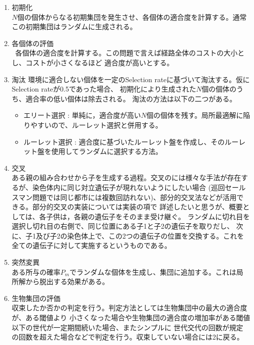 \documentclass[uplatex]{jsarticle}
\begin{document}
\begin{enumerate}
  \item 初期化 \mbox{}\\
  $N$個の個体からなる初期集団を発生させ、各個体の適合度を計算する。通常この初期集団はランダムに生成される。

  \item 各個体の評価 \mbox{}\\\
  各個体の適合度を計算する。この問題で言えば経路全体のコストの大小とし、コストが小さくなるほど
  適合度が高いとする。

  \item 淘汰
  環境に適合しない個体を一定のSelection rateに基づいて淘汰する。仮にSelection rateが0.5であった場合、
  初期化により生成された$N個$の個体のうち、適合率の低い個体は除去される。
  淘汰の方法は以下の二つがある。
  \begin{itemize}
    \item エリート選択 : 単純に，適合度が高い$N$個の個体を残す。局所最適解に陥りやすいので、ルーレット選択と併用する。
    \item ルーレット選択 : 適合度に基づいたルーレット盤を作成し、そのルーレット盤を使用してランダムに選択する方法。
  \end{itemize}
  \item 交叉 \mbox{}\\
  ある親の組み合わせから子を生成する過程。交叉のには様々な手法が存在するが、染色体内に同じ対立遺伝子が現れないようにしたい場合
  (巡回セールスマン問題では同じ都市には複数回訪れない)、部分的交叉法などが活用できる。部分的交叉の実装については実装の項で
  詳述したいと思うが、概要としては、各子供は，各親の遺伝子をそのまま受け継ぐ。
  ランダムに切れ目を選択し切れ目の右側で、同じ位置にある子1と子2の遺伝子を取りだし、
  次に、子1及び子2の染色体上で、この2つの遺伝子の位置を交換する。これを全ての遺伝子に対して実施するというものである。

  \item 突然変異 \mbox{}\\
  ある所与の確率$P_m$でランダムな個体を生成し、集団に追加する。これは局所解から脱出する効果がある。

  \item 生物集団の評価 \mbox{}\\
  収束したか否かの判定を行う。判定方法としては生物集団中の最大の適合度が、ある閾値より
  小さくなった場合や生物集団の適合度の増加率がある閾値以下の世代が一定期間続いた場合、またシンプルに
  世代交代の回数が規定の回数を超えた場合などで判定を行う。収束していない場合には2に戻る。
\end{enumerate}
\end{document}
